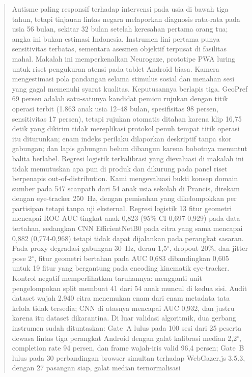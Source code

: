 \documentclass{article}
\begin{document}
\begin{abstract}
Autisme paling responsif terhadap intervensi pada usia di bawah tiga tahun, tetapi tinjauan
lintas negara melaporkan diagnosis rata-rata pada usia 56 bulan, sekitar 32 bulan setelah
keresahan pertama orang tua; angka ini bukan estimasi Indonesia. Instrumen lini pertama
punya sensitivitas terbatas, sementara asesmen objektif terpusat di fasilitas mahal. Makalah
ini memperkenalkan Neurogaze, prototipe PWA luring untuk riset pengukuran atensi pada tablet
Android biasa. Kamera
mengestimasi pola pandangan selama stimulus sosial dan menahan sesi yang gagal memenuhi
syarat kualitas. Keputusannya berlapis tiga. GeoPref 69 persen adalah satu-satunya kandidat
pemicu rujukan dengan titik operasi terbit (1.863 anak usia 12--48 bulan, spesifisitas 98
persen, sensitivitas 17 persen), tetapi rujukan otomatis ditahan karena klip 16,75 detik
yang dikirim tidak mereplikasi protokol penuh tempat titik operasi itu diturunkan; enam indeks perilaku
dilaporkan deskriptif tanpa skor gabungan; dan lapis gabungan belum dibangun karena bobotnya
menuntut balita berlabel. Regresi logistik terkalibrasi yang dievaluasi di makalah ini tidak
memutuskan apa pun di produk dan dikurung pada panel riset berpenapis out-of-distribution.
Kami mengevaluasi bukti konsep domain sumber pada 547 scanpath dari 54 anak usia sekolah di
Prancis, direkam dengan eye-tracker 250~Hz, dengan pemisahan yang dikelompokkan per
partisipan tetapi tanpa uji eksternal. Regresi logistik 13 fitur geometri mencapai ROC-AUC
tingkat anak 0,823 (95\% CI 0,697-0,929) pada data tertahan, sedangkan CNN EfficientNetB0
pada citra yang sama mencapai 0,882 (0,774-0,968) tetapi tidak dapat dijalankan pada
perangkat sasaran. Pada proxy degradasi gabungan 30~Hz, derau 1,5$^\circ$, dropout 20\%, dan
jitter pose 2$^\circ$, fitur geometri bertahan pada AUC 0,683 dibandingkan 0,605 untuk 19
fitur yang bergantung pada encoding kinematik eye-tracker. Kontrol negatif memperlihatkan
taruhannya: mengganti unit pengelompokan split membuat 41 dari 54 anak muncul di kedua sisi.
Audit dataset wajah 2.940 citra menemukan enam dari enam metadata tata kelola tidak tersedia;
CNN di atasnya mencapai AUC 0,932, dan justru karena itu dataset dikarantina. Di luar
validasi algoritmik, dua gerbang instrumen sudah dituntaskan: Gate~A lulus pada 100 sesi dari
25 peserta dewasa lintas tiga perangkat Android dengan galat kalibrasi median 2,2$^\circ$, completion rate
94 persen, dan frame wajah-iris valid 96,4 persen; Gate~B lulus pada 30 perbandingan browser
simultan terhadap WebGazer.js 3.5.3, dengan 27 pasangan siap, galat median ternormalisasi

\end{abstract}
\end{document}
